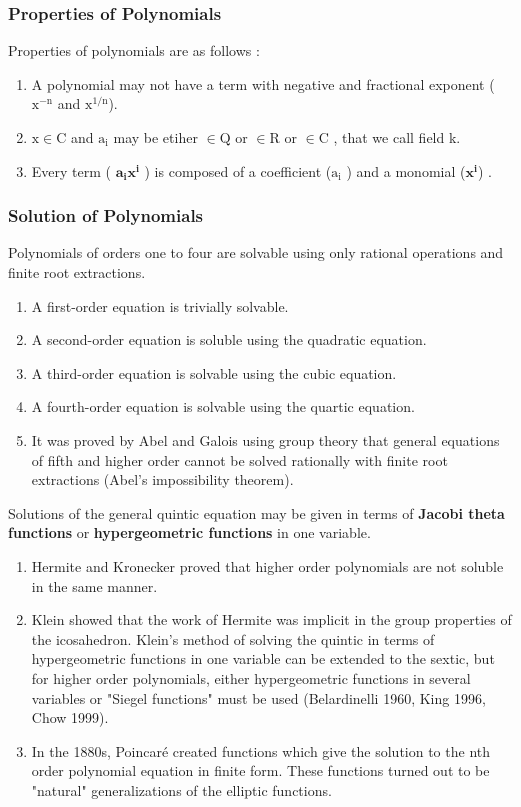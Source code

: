 \documentclass[11pt]{article}
\begin{document}
\subsubsection{Properties of Polynomials}

Properties of polynomials are as follows :
\begin{enumerate}
\item A polynomial may not have a term with negative and fractional exponent ($\mathrm{x^{-n}}$ and $\mathrm{x^{1/n}}$).
\item $\mathrm{x \in C}$ and $\mathrm{a_i}$ may be etiher  $\mathrm{\in Q}$ or $\mathrm{\in R}$ or $\mathrm{\in C}$ , that we call field k.
\item Every term ( $\mathbf{a_ix^i}$ ) is composed of a coefficient ($\mathrm{a_i}$ ) and a monomial ($\mathbf{x^i}$) .
\end{enumerate}

\subsubsection{Solution of Polynomials}

 Polynomials of orders one to four are solvable using only rational operations and finite root extractions. \cite{wolframPolynomial}
\begin{enumerate}
\item A first-order equation is trivially solvable.
\item A second-order equation is soluble using the quadratic equation.
\item A third-order equation is solvable using the cubic equation.
\item A fourth-order equation is solvable using the quartic equation.
\item It was proved by Abel and Galois using group theory that general equations of fifth and higher order cannot be solved rationally with finite root extractions (Abel's impossibility theorem).
\end{enumerate}

Solutions of the general quintic equation may be given in terms of \textbf{Jacobi theta functions} or \textbf{hypergeometric functions} in one variable.\cite{wolframPolynomial}
\begin{enumerate}
\item Hermite and Kronecker proved that higher order polynomials are not soluble in the same manner.
\item Klein showed that the work of Hermite was implicit in the group properties of the icosahedron. Klein's method of solving the quintic in terms of hypergeometric functions in one variable can be extended to the sextic, but for higher order polynomials, either hypergeometric functions in several variables or "Siegel functions" must be used (Belardinelli 1960, King 1996, Chow 1999).
\item In the 1880s, Poincaré created functions which give the solution to the nth order polynomial equation in finite form. These functions turned out to be "natural" generalizations of the elliptic functions.
\end{enumerate}
\end{document}
